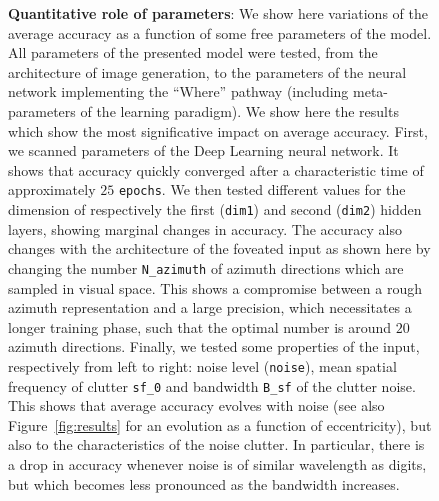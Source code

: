 \begin{figure}[t!]%
\caption{
{\bf Quantitative role of parameters}: We show here variations of the average accuracy as a function of some free parameters of the model. All parameters of the presented model were tested, from the architecture of image generation, to the parameters of the neural network implementing the ``Where'' pathway (including meta-parameters of the learning paradigm). We show here the results which show the most significative impact on average accuracy. %
\A First, we scanned parameters of the Deep Learning neural network. It shows that accuracy quickly converged after a characteristic time of approximately $25$ \texttt{epochs}. We then tested different values for the dimension of respectively the first (\texttt{dim1}) and second (\texttt{dim2}) hidden layers, showing marginal changes in accuracy. %
\B The accuracy also changes with the architecture of the foveated input as shown here by changing the number \texttt{N\_azimuth} of azimuth directions which are sampled in visual space. This shows a compromise between a rough azimuth representation and a large precision, which necessitates a longer training phase, such that the optimal number is around $20$ azimuth directions. %
\C Finally, we tested some properties of the input, respectively from left to right: noise level (\texttt{noise}), mean spatial frequency of clutter \texttt{sf\_0} and bandwidth \texttt{B\_sf} of the clutter noise. This shows that average accuracy evolves with noise (see also Figure~\ref{fig:results} for an evolution as a function of eccentricity), but also to the characteristics of the noise clutter. In particular, there is a drop in accuracy whenever noise is of similar wavelength as digits, but which becomes less pronounced as the bandwidth increases. %
\label{fig:params}}%
\end{figure}%


